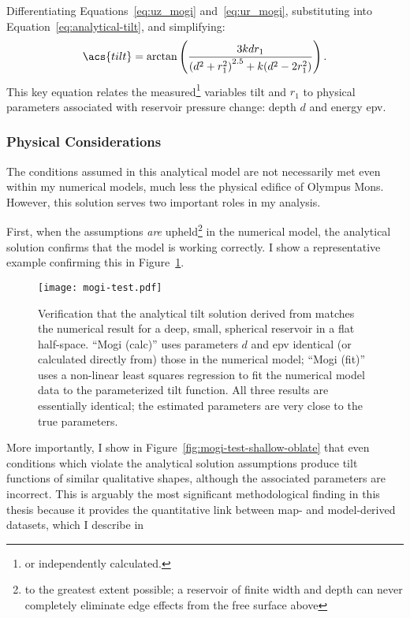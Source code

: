 Differentiating Equations~\eqref{eq:uz_mogi} and~\eqref{eq:ur_mogi}, substituting into Equation~\eqref{eq:analytical-tilt}, and simplifying:
\begin{equation}
    \acs{tilt} = \arctan\left(\frac{3kdr_1}{{(d^2+r_1^2)}^{2.5}+k(d^2-2r_1^2)}\right).\label{eq:mogi-tilt}
\end{equation}
This key equation relates the measured\footnote{or independently calculated.} variables \acs{tilt} and $r_1$ to physical parameters associated with reservoir pressure change: depth $d$ and energy \acs{epv}.

\subsubsection{Physical Considerations}

The conditions assumed in this analytical model are not necessarily met even within my numerical models, much less the physical edifice of Olympus Mons. However, this solution serves two important roles in my analysis. 

First, when the assumptions \emph{are} upheld\footnote{to the greatest extent possible; a reservoir of finite width and depth can never completely eliminate edge effects from the free surface above} in the numerical model, the analytical solution confirms that the model is working correctly. I show a representative example confirming this in Figure~\ref{fig:mogi-test}.

\begin{figure}
    \texttt{[image: mogi-test.pdf]}%
    \caption[Analytical solution verification]{Verification that the analytical tilt solution derived from \textcite{mogi_relations_1958} matches the numerical result for a deep, small, spherical reservoir in a flat half-space. ``Mogi (calc)'' uses parameters $d$ and \acs{epv} identical (or calculated directly from) those in the numerical model; ``Mogi (fit)'' uses a non-linear least squares regression to fit the numerical model data to the parameterized tilt function. All three results are essentially identical; the estimated parameters are very close to the true parameters.}%
    \label{fig:mogi-test}
\end{figure}

More importantly, I show in Figure~\ref{fig:mogi-test-shallow-oblate} that even conditions which violate the analytical solution assumptions produce tilt functions of similar qualitative shapes, although the associated parameters are incorrect. This is arguably the most significant methodological finding in this thesis because it provides the quantitative link between map- and model-derived datasets, which I describe in 

